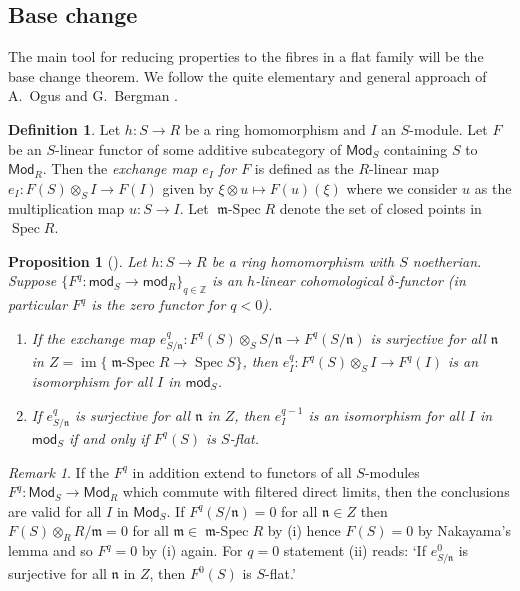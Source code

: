 \documentclass[a4paper,10pt]{amsart}
\theoremstyle{plain}
\newtheorem{prop}[xx]{Proposition}%
\theoremstyle{definition}
\newtheorem{defn}[xx]{Definition}%
\theoremstyle{remark}
\newtheorem{rem}[xx]{Remark}
\numberwithin{equation}{xx}
\DeclareMathOperator{\im}{im}
\DeclareMathOperator{\mSpec}{\fr{m}-Spec}
\DeclareMathOperator{\Spec}{Spec}
\newcommand{\co}{\colon}
\newcommand{\ra}{\rightarrow}
\newcommand{\ot}{{\otimes}}
\newcommand{\BB}[1]{\mathbb{{#1}}}
\newcommand{\cat}[1]{\mathsf{{#1}}}
\newcommand{\fr}[1]{\mathfrak{{#1}}}
\begin{document}
\subsection{Base change}
The main tool for reducing properties to the fibres in a flat family will be the base change theorem.
We follow the quite elementary and general approach of A.\ Ogus and G.\ Bergman \cite{ogu/ber:72}.
\begin{defn}
Let \(h\co S\ra R\) be a ring homomorphism and \(I\) an \(S\)-module.
Let \(F\) be an \(S\)-linear functor of some additive subcategory of \(\cat{Mod}_{S}\) containing \(S\) to \(\cat{Mod}_{R}\). Then the \emph{exchange map \(e_{I}\) for \(F\)} is defined as the \(R\)-linear map \(e_{I}\co F(S)\ot_{S}I\ra F(I)\) given by \(\xi\ot u\mapsto F(u)(\xi)\) where we consider \(u\) as the multiplication map \(u\co S\ra I\). Let \(\mSpec R\) denote the set of closed points in \(\Spec R\).
\end{defn}
\begin{prop}[{\cite[5.1-2]{ogu/ber:72}}]\label{prop.nakayama}
Let \(h\co S\ra R\) be a ring homomorphism with \(S\) noetherian\textup{.} Suppose \(\{F^{q}\co \cat{mod}_{S}\ra \cat{mod}_{R}\}_{q\in \BB{Z}}\) is an \(h\)-linear cohomological \(\delta\)-functor \textup{(}in particular \(F^{q}\) is the zero functor for \(q<0\)\textup{).} 
\begin{enumerate}
\item[(i)] If the exchange map \(e_{S/\fr{n}}^{q}\co F^{q}(S)\ot_{S}S/\fr{n}\ra F^{q}(S/\fr{n})\) is surjective for all \(\fr{n}\) in \(Z=\im\{\mSpec R\ra\Spec S\}\)\textup{,} then \(e_{I}^{q}\co F^{q}(S)\ot_{S}I\ra F^{q}(I)\) is an isomorphism for all \(I\) in \(\cat{mod}_{S}\)\textup{.} 
\item[(ii)] If \(e_{S/\fr{n}}^{q}\) is surjective for all \(\fr{n}\) in \(Z\)\textup{,} then \(e_{I}^{q-1}\) is an isomorphism for all \(I\) in \(\cat{mod}_{S}\) if and only if \(F^{q}(S)\) is \(S\)-flat\textup{.}
\end{enumerate}
\end{prop}
\begin{rem}
If the \(F^{q}\) in addition extend to functors of all \(S\)-modules \(F^{q}\co \cat{Mod}_{S}\ra\cat{Mod}_{R}\) which commute with filtered direct limits, then the conclusions are valid for all \(I\) in \(\cat{Mod}_{S}\).
If \(F^{q}(S/\fr{n})=0\) for all \(\fr{n}\in Z\) then \(F(S)\ot_{R}R/\fr{m}=0\) for all \(\fr{m}\in\mSpec R\) by (i) hence \(F(S)=0\) by Nakayama's lemma and so \(F^{q}=0\) by (i) again.
For \(q=0\) statement (ii) reads: `If \(e_{S/\fr{n}}^{0}\) is surjective for all \(\fr{n}\) in \(Z\)\textup{,} then \(F^{0}(S)\) is \(S\)-flat\textup{.}'
\end{rem} 
\end{document}
